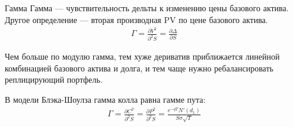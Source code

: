 \documentclass{beamer}
\begin{document}
\begin{frame}{Гамма}
\justify
\alert{Гамма} --- чувствительность дельты к изменению цены базового актива. Другое определение --- вторая производная PV по цене базового актива.
\begin{align*}
\Gamma = \frac{\partial V^2}{\partial^2 S} = \frac{\partial \Delta}{\partial S}
\end{align*}

\justify
Чем больше по модулю гамма, тем хуже дериватив приближается линейной комбинацией базового актива и долга, и тем чаще нужно ребалансировать реплицирующий портфель.

\justify
В модели Блэка-Шоулза гамма колла равна гамме пута:
\begin{align*}
\Gamma = \frac{\partial C^2}{\partial^2 S} = \frac{\partial P^2}{\partial^2 S} =
\frac{e^{-qT}N'(d_1)}{S\sigma\sqrt{T}} 
\end{align*} 
\end{frame}
\end{document}
